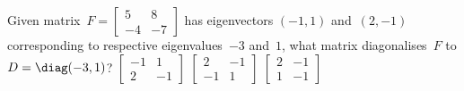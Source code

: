 \begin{activity}
Given matrix~\(F=\begin{bmatrix} 5&8\\-4&-7 \end{bmatrix}\) has eigenvectors \((-1,1)\) and~\((2,-1)\) corresponding to respective eigenvalues~\(-3\) and~\(1\), what matrix diagonalises~\(F\) to \(D=\diag(-3,1)\)?
{\(\begin{bmatrix} -1&1\\2&-1 \end{bmatrix}\)}
{\(\begin{bmatrix} 2&-1\\-1&1 \end{bmatrix}\)}
{\(\begin{bmatrix} 2&-1\\1&-1 \end{bmatrix}\)}
\end{activity}




